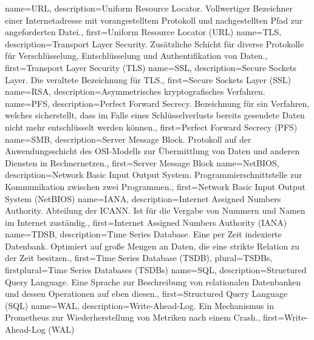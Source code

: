 {%
    name={URL},
    description={Uniform Resource Locator. Vollwertiger Bezeichner einer
    Internetadresse mit vorangestelltem Protokoll und nachgestellten
    Pfad zur angeforderten Datei.},
    first={Uniform Resource Locator (URL)}
}
{%
    name={TLS},
    description={Transport Layer Security. Zusätzliche Schicht für
    diverse Protokolle für Verschlüsselung, Entschlüsselung und
    Authentifikation von Daten.},
    first={Transport Layer Security (TLS)}
}
{%
    name={SSL},
    description={Secure Sockets Layer. Die veraltete Bezeichnung für
    TLS.},
    first={Secure Sockets Layer (SSL)}
}
{%
    name={RSA},
    description={Asymmetrisches kryptografisches Verfahren.}
}
{%
    name={PFS},
    description={Perfect Forward Secrecy. Bezeichnung für ein Verfahren,
    welches sicherstellt, dass im Falle eines Schlüsselverlusts bereits
    gesendete Daten nicht mehr entschlüsselt werden können.},
    first={Perfect Forward Secrecy (PFS)}
}
{%
    name={SMB},
    description={Server Message Block. Protokoll auf der
    Anwendungsschicht des OSI\hyp{}Modells zur Übermittlung von Daten und
    anderen Diensten in Rechnernetzen.},
    first={Server Message Block}
}
{%
    name={NetBIOS},
    description={Network Basic Input Output System.
    Programmierschnittstelle zur Kommunikation zwischen zwei Programmen.},
    first={Network Basic Input Output System (NetBIOS)}
}
{%
    name={IANA},
    description={Internet Assigned Numbers Authority. Abteilung der
    ICANN. Ist für die Vergabe von Nummern und Namen im Internet
    zuständig.},
    first={Internet Assigned Numbers Authority (IANA)}
}
{%
    name={TDSB},
    description={Time Series Database. Eine per Zeit indexierte
    Datenbank. Optimiert auf große Mengen an Daten, die eine strikte
    Relation zu der Zeit besitzen.},
    first={Time Series Database (TSDB)},
    plural={TSDBs},
    firstplural={Time Series Databases (TSDBs)}
}
{%
    name={SQL},
    description={Structured Query Language. Eine Sprache zur
    Beschreibung von relationalen Datenbanken und dessen Operationen auf
    eben diesen.},
    first={Structured Query Language (SQL)}
}
{%
    name={WAL},
    description={Write-Ahead-Log. Ein Mechanismus in Prometheus zur
    Wiederherstellung von Metriken nach einem Crash.},
    first={Write-Ahead-Log (WAL)}
}
